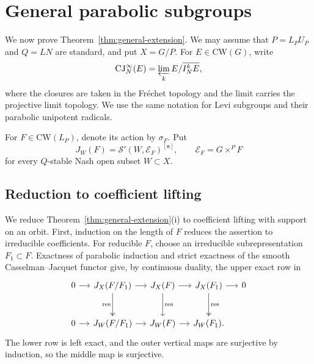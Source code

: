 \documentclass[a4paper,12pt]{amsart}
\numberwithin{equation}{section}
\theoremstyle{definition}
\theoremstyle{remark}
\newcommand{\fn}{\mathfrak n}
\newcommand{\mcS}{\mathcal S}
\newcommand{\mcE}{\mathcal E}
\begin{document}
\section{General parabolic subgroups}\label{sec:general-parabolics}

We now prove Theorem~\ref{thm:general-extension}. We may assume that $P=L_PU_P$ and $Q=LN$ are standard, and put $X=G/P$. For $E\in\mathrm{CW}(G)$, write
\[
 \mathrm{CJ}^{\infty}_N(E)=\varprojlim_k E/\overline{I_N^kE},
\]
where the closures are taken in the Fr\'echet topology and the limit carries the projective limit topology. We use the same notation for Levi subgroups and their parabolic unipotent radicals.

For $F\in\mathrm{CW}(L_P)$, denote its action by
$\sigma_F$. Put
\[
 J_W(F)=\mcS'(W,\mcE_F)^{[\fn]},\qquad \mcE_F=G\times^P F
\]
for every $Q$-stable Nash open subset $W\subset X$.


\subsection{Reduction to coefficient lifting}\label{ssec:coefficient-reduction}

We reduce Theorem~\ref{thm:general-extension}(i) to coefficient lifting with support on an orbit. First, induction on the length of $F$ reduces the assertion to irreducible coefficients. For reducible $F$, choose an irreducible subrepresentation $F_1\subset F$. Exactness of parabolic induction and strict exactness of the smooth Casselman--Jacquet functor \cite[Theorem~14.3]{CWYZ26} give, by continuous duality, the upper exact row in
\[
\begin{tikzcd}[column sep=small,row sep=large]
 0\arrow[r]&J_X(F/F_1)\arrow[r]\arrow[d,two heads,"\mathrm{res}"']
 &J_X(F)\arrow[r]\arrow[d,"\mathrm{res}"]
 &J_X(F_1)\arrow[r]\arrow[d,two heads,"\mathrm{res}"]&0\\
 0\arrow[r]&J_W(F/F_1)\arrow[r]&J_W(F)\arrow[r]&J_W(F_1).
\end{tikzcd}
\]
The lower row is left exact, and the outer vertical maps are surjective by induction, so the middle map is surjective.
\end{document}

